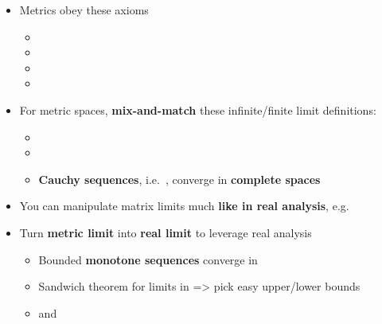 \begin{itemize}

\item
  Metrics obey these axioms

  \begin{itemize}
  
  \item
  \item
  \item
  \item
  \end{itemize}
\item
  For metric spaces, \textbf{mix-and-match} these infinite/finite limit
  definitions:

  \begin{itemize}
  
  \item
  \item
  \item
    \textbf{Cauchy sequences},
    i.e.~,
    converge in \textbf{complete spaces}
  \end{itemize}
\item
  You can manipulate matrix limits much \textbf{like in real analysis},
  e.g.~
\item
  Turn \textbf{metric limit} 
  into \textbf{real limit}
   to leverage real
  analysis

  \begin{itemize}
  
  \item
    Bounded \textbf{monotone sequences} converge in 
  \item
    Sandwich theorem for limits in  =\textgreater{}
    pick easy upper/lower bounds
  \item
     and
  \end{itemize}
\end{itemize}